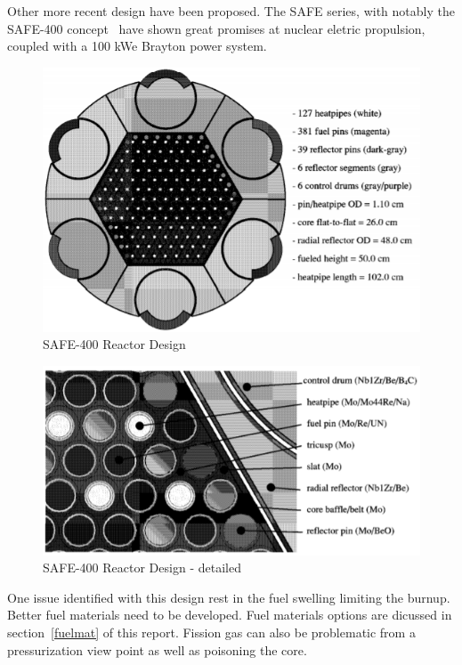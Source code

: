 \documentclass{article}
\begin{document}
Other more recent design have been proposed. The SAFE series, with notably the SAFE-400 concept~\cite{poston2002design} have shown great promises at nuclear eletric propulsion, coupled with a 100 kWe Brayton power system.


\begin{figure}[]
	\centering
	\includegraphics[height=0.45\textheight]{fig/appR1}
	\caption[SAFE-400 Reactor Design]{SAFE-400 Reactor Design~\cite{poston2002design}}
	\label{appR1}
\end{figure}


\begin{figure}[]
	\centering
	\includegraphics[height=0.35\textheight]{fig/appR2}
	\caption[SAFE-400 Reactor Design - Detailed]{SAFE-400 Reactor Design - detailed~\cite{poston2002design}}
	\label{appR2}
\end{figure}

One issue identified with this design rest in the fuel swelling limiting the burnup. Better fuel materials need to be developed. Fuel materials options are dicussed in section~\ref{fuelmat} of this report. Fission gas can also be problematic from a pressurization view point as well as poisoning the core.
\end{document}
